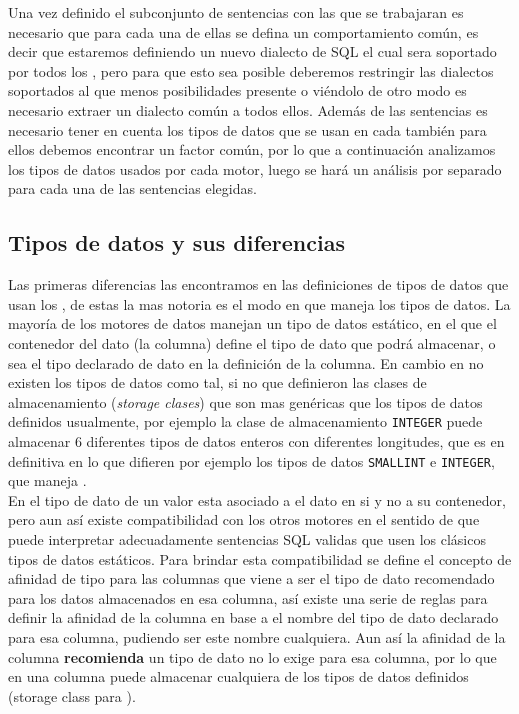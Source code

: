 Una vez definido el subconjunto de sentencias con las que se trabajaran es necesario que para cada una de ellas se defina un comportamiento común, es decir que estaremos definiendo un nuevo dialecto de SQL el cual sera soportado por todos los \dd, pero para que esto sea posible deberemos restringir las dialectos soportados al que menos posibilidades presente o viéndolo de otro modo es necesario extraer un dialecto común a todos ellos. Además de las sentencias es necesario tener en cuenta los tipos de datos que se usan en cada \dd también para ellos debemos encontrar un factor común, por lo que a continuación analizamos los tipos de datos usados por cada motor, luego se hará un análisis por separado para cada una de las sentencias elegidas.



\subsection{Tipos de datos y sus diferencias}
Las primeras diferencias las encontramos en las definiciones de tipos de datos que usan los \dd, de estas la mas notoria es el modo en que \s maneja los tipos de datos. La mayoría de los motores de datos manejan un tipo de datos estático, en el que el contenedor del dato (la columna) define el tipo de dato que podrá almacenar, o sea el tipo declarado de dato en la definición de la columna. En cambio en \s no existen los tipos de datos como tal, si no que definieron las clases de almacenamiento\cite{sqlite:datatypes} (\textit{storage clases}) que son mas genéricas que los tipos de datos definidos usualmente, por ejemplo la clase de almacenamiento \verb=INTEGER= puede almacenar 6 diferentes tipos de datos enteros con diferentes longitudes, que es en definitiva en lo que difieren por ejemplo los tipos de datos \verb=SMALLINT= e \verb=INTEGER=, que maneja \m.\\

 En \s el tipo de dato de un valor esta asociado a el dato en si y no a su contenedor, pero aun así existe compatibilidad con los otros motores en el sentido de que \s puede interpretar adecuadamente sentencias SQL validas que usen los clásicos tipos de datos estáticos. Para brindar esta compatibilidad se define el concepto de afinidad de tipo para las columnas que viene a ser el tipo de dato recomendado para los datos almacenados en esa columna, así existe una serie de reglas para definir la afinidad de la columna en base a el nombre del tipo de dato declarado para esa columna, pudiendo ser este nombre cualquiera. Aun así la afinidad de la columna \textbf{recomienda} un tipo de dato no lo exige para esa columna, por lo que en \s una columna puede almacenar cualquiera de los tipos de datos definidos (storage class para \s).\\
 
